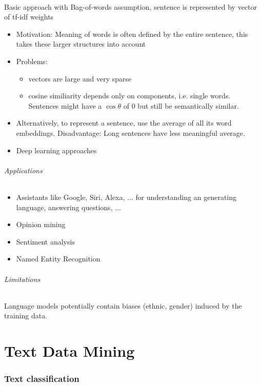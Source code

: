 \documentclass[10pt,twocolumn]{article}
\begin{document}
\paragraph{} Basic approach with Bag-of-words
assumption, sentence is represented by vector of tf-idf weights
\begin{itemize}
\item Motivation: Meaning of words is often defined by the entire sentence, this
  takes these larger structures into account
\item  Problems:
  \begin{itemize}
  \item vectors are large and very sparse
  \item cosine similiarity depends only on components, i.e. single words.
    Sentences might have a $\cos \theta$ of $0$ but still be semantically similar.
  \end{itemize}
\item Alternatively, to represent a sentence, use the average of all its word
  embeddings. Disadvantage: Long sentences have less meaningful average.
\item Deep learning approaches
\end{itemize}

\paragraph{\textit{Applications}}
\begin{itemize}
\item Assistants like Google, Siri, Alexa, ... for understanding an generating
  language, answering questions, ...
\item Opinion mining
\item Sentiment analysis
\item Named Entity Recognition
\end{itemize}

\paragraph{\textit{Limitations}} Language models potentially contain biases
(ethnic, gender) induced by the training data.


\pagebreak
\part{Text Data Mining}

\section{Text classification}
\end{document}
